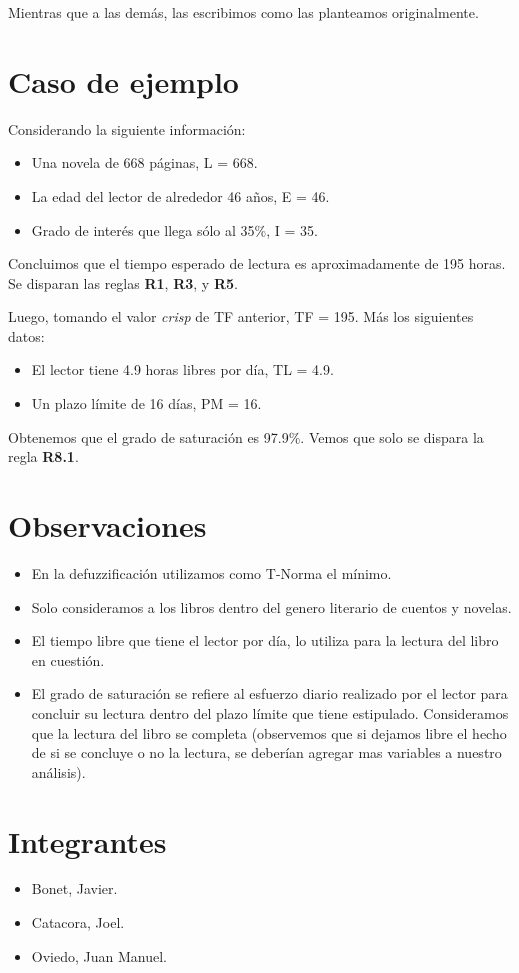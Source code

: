\documentclass[a4paper, 8pt]{article}
\begin{document}
Mientras que a las demás, las escribimos como las planteamos originalmente.


\section{Caso de ejemplo}

Considerando la siguiente información:

\begin{itemize}
  \item Una novela de 668 páginas, L = 668.
  \item La edad del lector de alrededor 46 años, E = 46.
  \item Grado de interés que llega sólo al 35\%, I = 35.
  \end{itemize}

Concluimos que el tiempo esperado de lectura es aproximadamente de 195 horas.
Se disparan las reglas \textbf{R1}, \textbf{R3}, y \textbf{R5}.

Luego, tomando el valor \textit{crisp} de TF anterior, TF = 195. Más los siguientes datos:

\begin{itemize}
  \item El lector tiene 4.9 horas libres por día, TL = 4.9.
  \item Un plazo límite de 16 días, PM = 16.
\end{itemize}

Obtenemos que el grado de saturación es 97.9\%. 
Vemos que solo se dispara la regla \textbf{R8.1}.

\section{Observaciones}

\begin{itemize}
  \item En la defuzzificación utilizamos como T-Norma el mínimo.
  \item Solo consideramos a los libros dentro del genero literario de cuentos y novelas.
  \item El tiempo libre que tiene el lector por día, lo utiliza para la lectura del libro en cuestión.
  \item El grado de saturación se refiere al esfuerzo diario realizado por el lector para concluir su lectura dentro del plazo límite
    que tiene estipulado. Consideramos que la lectura del libro se completa (observemos que si dejamos libre el hecho de si se concluye o no la lectura, se deberían agregar mas variables a nuestro análisis).
  \end{itemize}

\section{Integrantes}
\begin{itemize}
  \item Bonet, Javier.
  \item Catacora, Joel.
  \item Oviedo, Juan Manuel.
\end{itemize}
\end{document}
